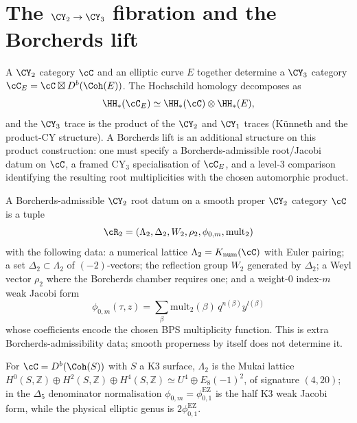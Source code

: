 \section{The \texorpdfstring{$\CY_2 \to \CY_3$}{CY-2 -> CY-3} fibration and the Borcherds lift}
\label{sec:thy-fibration-cy2-cy3}

A $\CY_2$ category $\cC$ and an elliptic curve $E$ together determine a
$\CY_3$ category $\cC_E = \cC \boxtimes D^b(\Coh(E))$.  The Hochschild
homology decomposes as
\[
  \HH_*(\cC_E) \simeq \HH_*(\cC) \otimes \HH_*(E),
\]
and the $\CY_3$ trace is the product of the $\CY_2$ and $\CY_1$ traces
\textup{(}K\"unneth and the product-CY structure\textup{)}.  A
Borcherds lift is an additional structure on this product construction:
one must specify a Borcherds-admissible root/Jacobi datum on $\cC$, a
framed CY$_3$ specialisation of $\cC_E$, and a level-$3$ comparison
identifying the resulting root multiplicities with the chosen
automorphic product.

\begin{definition}
\label{def:thy-fibration-cy2-root-datum}
A Borcherds-admissible $\CY_2$ root datum on a smooth proper $\CY_2$
category $\cC$ is a tuple
\[
  \cR_2 =
  (\Lambda_2,\Delta_2,W_2,\rho_2,\phi_{0,m},\mathrm{mult}_2)
\]
with the following data: a numerical lattice
$\Lambda_2=K_{\mathrm{num}}(\cC)$ with Euler pairing; a set
$\Delta_2\subset\Lambda_2$ of $(-2)$-vectors; the reflection group
$W_2$ generated by $\Delta_2$; a Weyl vector $\rho_2$ where the
Borcherds chamber requires one; and a weight-$0$ index-$m$ weak Jacobi
form
\[
  \phi_{0,m}(\tau,z)=
  \sum_\beta \mathrm{mult}_2(\beta)\,
    q^{n(\beta)}y^{l(\beta)}
\]
whose coefficients encode the chosen BPS multiplicity function.  This
is extra Borcherds-admissibility data; smooth properness by itself does
not determine it.

For $\cC = D^b(\Coh(S))$ with $S$ a K3 surface, $\Lambda_2$ is the
Mukai lattice
$H^0(S,\mathbb Z)\oplus H^2(S,\mathbb Z)\oplus H^4(S,\mathbb Z)
\simeq U^4 \oplus E_8(-1)^2$, of signature $(4,20)$; in the
$\Delta_5$ denominator normalisation
$\phi_{0,m}=\phi_{0,1}^{\mathrm{EZ}}$ is the half K3 weak Jacobi form,
while the physical elliptic genus is $2\phi_{0,1}^{\mathrm{EZ}}$.
\end{definition}

